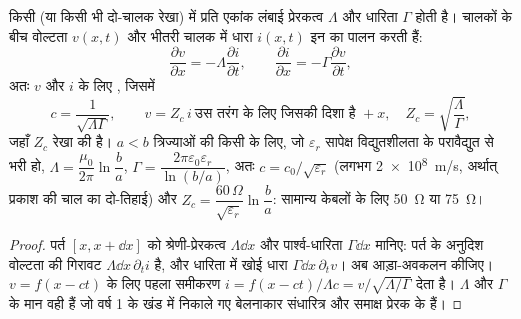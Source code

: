 \begin{proposition}[टेलीग्राफ समीकरण; हानि-रहित रेखा]\label{prop:b2:dispersion-wave-packets:coax}
किसी  (या किसी भी दो-चालक रेखा) में प्रति एकांक लंबाई
प्रेरकत्व $\Lambda$ और धारिता $\Gamma$ होती है। चालकों के बीच वोल्टता $v(x, t)$
और भीतरी चालक में धारा $i(x, t)$ इन
\emph{} का पालन करती हैं:
\[
\frac{\partial v}{\partial x} = -\Lambda\frac{\partial i}{\partial t} , \qquad
\frac{\partial i}{\partial x} = -\Gamma\frac{\partial v}{\partial t} ,
\]
अतः $v$ और $i$ के लिए , जिसमें
\[
c = \frac1{\sqrt{\Lambda\Gamma}} , \qquad
v = Z_c\,i \ \text{उस तरंग के लिए जिसकी दिशा है } +x, \quad Z_c = \sqrt{\frac\Lambda\Gamma} ,
\]
जहाँ $Z_c$ रेखा की \emph{} है। $a < b$ त्रिज्याओं की
किसी  के लिए, जो $\varepsilon_r$ सापेक्ष विद्युतशीलता के परावैद्युत से
भरी हो, $\Lambda = \dfrac{\mu_0}{2\pi}\ln\dfrac ba$, $\Gamma =
\dfrac{2\pi\varepsilon_0\varepsilon_r}{\ln(b/a)}$, अतः $c = c_0/\sqrt{\varepsilon_r}$ (लगभग
\qty{2e8}{m/s}, अर्थात् प्रकाश की चाल का दो-तिहाई) और $Z_c = \dfrac{60\,\Omega}
{\sqrt{\varepsilon_r}}\ln\dfrac ba$: सामान्य केबलों के लिए \qty{50}{\ohm} या \qty{75}{\ohm}।
\end{proposition}

\begin{proof}
पर्त $[x, x + \dd x]$ को श्रेणी-प्रेरकत्व $\Lambda\dd x$ और
पार्श्व-धारिता $\Gamma\dd x$ मानिए: पर्त के अनुदिश वोल्टता की गिरावट
$\Lambda\dd x\,\partial_ti$ है, और धारिता में खोई धारा $\Gamma\dd x
\,\partial_tv$। अब आड़ा-अवकलन कीजिए। $v = f(x - ct)$ के लिए पहला समीकरण
$i = f(x - ct)/\Lambda c = v/\sqrt{\Lambda/\Gamma}$ देता है। $\Lambda$ और
$\Gamma$ के मान वही हैं जो वर्ष 1 के खंड में निकाले गए बेलनाकार संधारित्र और
समाक्ष प्रेरक के हैं।
\end{proof}

